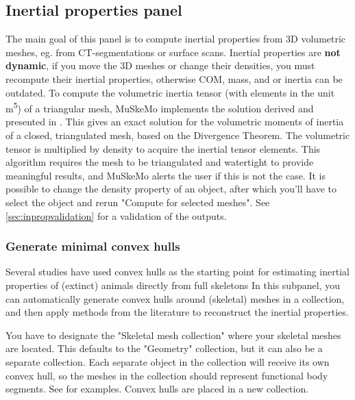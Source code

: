 \documentclass{article}
\begin{document}
\label{sec:MSM_glob_settings}



\subsection{Inertial properties panel}
\label{sec:inproppanel}

The main goal of this panel is to compute inertial properties from 3D volumetric meshes, eg. from CT-segmentations or surface scans.
Inertial properties are \textbf{not dynamic}, if you move the 3D meshes or change their densities, you must recompute their inertial properties, otherwise COM, mass, and or inertia can be outdated.
To compute the volumetric inertia tensor (with elements in the unit \si{m^5}) of a triangular mesh, MuSkeMo implements the solution derived and presented in \cite{eberlyGamePhysics2004}. This gives an exact solution for the volumetric moments of inertia of a closed, triangulated mesh, based on the Divergence Theorem. The volumetric tensor is multiplied by density to acquire the inertial tensor elements. This algorithm requires the mesh to be triangulated and watertight to provide meaningful results, and MuSkeMo alerts the user if this is not the case. It is possible to change the density property of an object, after which you'll have to select the object and rerun "Compute for selected meshes". See \ref{sec:inpropvalidation} for a validation of the outputs.

\subsubsection{Generate minimal convex hulls}
Several studies have used convex hulls as the starting point for estimating inertial properties of (extinct) animals directly from full skeletons %
In this subpanel, you can automatically generate convex hulls around (skeletal) meshes in a collection, and then apply methods from the literature to reconstruct the inertial properties.

You have to designate the "Skeletal mesh collection" where your skeletal meshes are located. This defaults to the "Geometry" collection, but it can also be a separate collection. Each separate object in the collection will receive its own convex hull,
 so the meshes in the collection should represent functional body segments. See \cite{sellersMinimumConvexHull2012a,coathamConvexHullEstimation2021, macaulayDecouplingBodyShape2023} for examples. Convex hulls are placed in a new collection.
\end{document}
